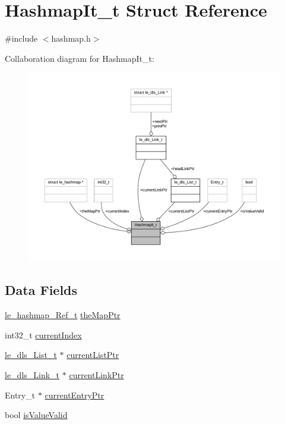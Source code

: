 \hypertarget{struct_hashmap_it__t}{}\section{Hashmap\+It\+\_\+t Struct Reference}
\label{struct_hashmap_it__t}


{\ttfamily \#include $<$hashmap.\+h$>$}



Collaboration diagram for Hashmap\+It\+\_\+t\+:
\nopagebreak
\begin{figure}[H]
\begin{center}
\leavevmode
\includegraphics[width=350pt]{struct_hashmap_it__t__coll__graph}
\end{center}
\end{figure}
\subsection*{Data Fields}
\begin{DoxyCompactItemize}
\item 
\hyperlink{le__hashmap_8h_ae81c60860dbdb8c59beaf25985e5605a}{le\+\_\+hashmap\+\_\+\+Ref\+\_\+t} \hyperlink{struct_hashmap_it__t_a22d2df8388e822a531d93c3ed597285a}{the\+Map\+Ptr}
\item 
int32\+\_\+t \hyperlink{struct_hashmap_it__t_ab8ed43a009cc8d12c5b973e43ec0e3d0}{current\+Index}
\item 
\hyperlink{structle__dls___list__t}{le\+\_\+dls\+\_\+\+List\+\_\+t} $\ast$ \hyperlink{struct_hashmap_it__t_a76f65f07d1a0442411da4b50b17406a5}{current\+List\+Ptr}
\item 
\hyperlink{structle__dls___link__t}{le\+\_\+dls\+\_\+\+Link\+\_\+t} $\ast$ \hyperlink{struct_hashmap_it__t_ac6946a0f68f54f2fa76360f3abe80915}{current\+Link\+Ptr}
\item 
Entry\+\_\+t $\ast$ \hyperlink{struct_hashmap_it__t_a171bb41f7cbfee64167525d662e81de2}{current\+Entry\+Ptr}
\item 
bool \hyperlink{struct_hashmap_it__t_a04019466db04827112bc2963f67e19e1}{is\+Value\+Valid}
\end{DoxyCompactItemize}


